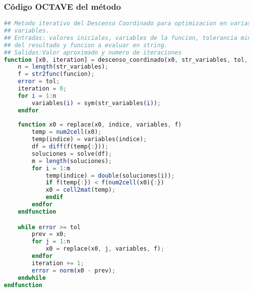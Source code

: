 \documentclass[12pt]{article}
\begin{document}
\subsubsection{Código OCTAVE del método}
\begin{lstlisting}[language=OCTAVE, caption=Implementación del método del Descenso Coordinado en Octave]
## Metodo iterativo del Descenso Coordinado para optimizacion en varias
## variables.
## Entradas: valores iniciales, variables de la funcion, tolerancia minima
## del resultado y funcion a evaluar en string.
## Salidas:Valor aproximado y numero de iteraciones
function [x0, iteration] = descenso_coordinado(x0, str_variables, tol, funcion)
    n = length(str_variables);
    f = str2func(funcion);
    error = tol;
    iteration = 0;
    for i = 1:n
        variables(i) = sym(str_variables(i));
    endfor
    
    function x0 = replace(x0, indice, variables, f)
        temp = num2cell(x0);
        temp(indice) = variables(indice);
        df = diff(f(temp{:}));
        soluciones = solve(df);
        m = length(soluciones);
        for i = 1:m
            temp(indice) = double(soluciones(i));
            if f(temp{:}) < f(num2cell(x0){:})
            x0 = cell2mat(temp);
            endif
        endfor
    endfunction

    while error >= tol
        prev = x0;
        for j = 1:n
            x0 = replace(x0, j, variables, f);
        endfor
        iteration += 1;
        error = norm(x0 - prev);
    endwhile
endfunction
\end{lstlisting}
\end{document}
